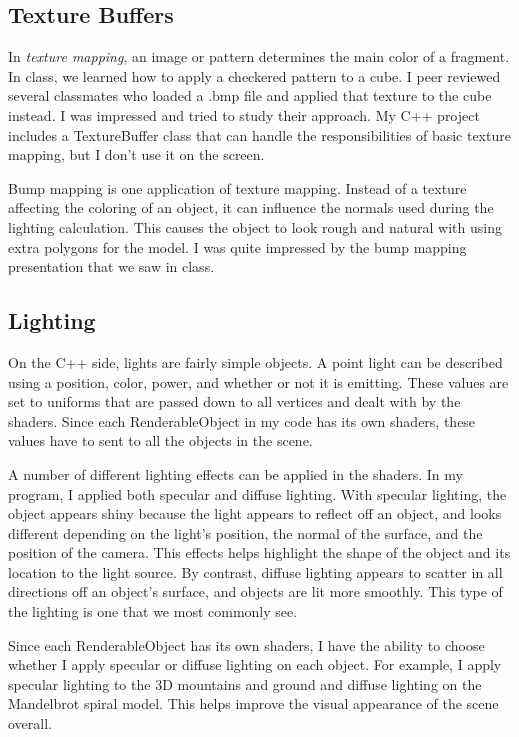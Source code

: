 \documentclass[journal]{IEEEtran}
\begin{document}
\subsection{Texture Buffers}

In \textit{texture mapping}, an image or pattern determines the main color of a fragment. In class, we learned how to apply a checkered pattern to a cube. I peer reviewed several classmates who loaded a .bmp file and applied that texture to the cube instead. I was impressed and tried to study their approach. My C++ project includes a TextureBuffer class that can handle the responsibilities of basic texture mapping, but I don't use it on the screen.

Bump mapping is one application of texture mapping. Instead of a texture affecting the coloring of an object, it can influence the normals used during the lighting calculation. This causes the object to look rough and natural with using extra polygons for the model. I was quite impressed by the bump mapping presentation that we saw in class.

\subsection{Lighting}

On the C++ side, lights are fairly simple objects. A point light can be described using a position, color, power, and whether or not it is emitting. These values are set to uniforms that are passed down to all vertices and dealt with by the shaders. Since each RenderableObject in my code has its own shaders, these values have to sent to all the objects in the scene.

A number of different lighting effects can be applied in the shaders. In my program, I applied both specular and diffuse lighting. With specular lighting, the object appears shiny because the light appears to reflect off an object, and looks different depending on the light's position, the normal of the surface, and the position of the camera. This effects helps highlight the shape of the object and its location to the light source. By contrast, diffuse lighting appears to scatter in all directions off an object's surface, and objects are lit more smoothly. This type of the lighting is one that we most commonly see.

Since each RenderableObject has its own shaders, I have the ability to choose whether I apply specular or diffuse lighting on each object. For example, I apply specular lighting to the 3D mountains and ground and diffuse lighting on the Mandelbrot spiral model. This helps improve the visual appearance of the scene overall.
\end{document}
